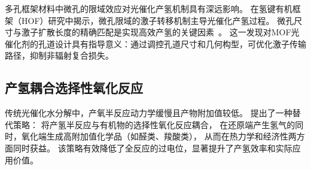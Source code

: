 多孔框架材料中微孔的限域效应对光催化产氢机制具有深远影响。
\citet{zhou2023micropore_exciton}在氢键有机框架（HOF）研究中揭示，微孔限域的激子转移机制主导光催化产氢过程。 %
微孔尺寸与激子扩散长度的精确匹配是实现高效产氢的关键因素~\citep{zhou2023micropore_exciton}。 %
这一发现对MOF光催化剂的孔道设计具有指导意义：通过调控孔道尺寸和几何构型，可优化激子传输路径，抑制非辐射复合损失。


\subsection{产氢耦合选择性氧化反应}

传统光催化水分解中，产氧半反应动力学缓慢且产物附加值较低。
\citet{lin2025coupled_oxidation}提出了一种替代策略：
将产氢半反应与有机物的选择性氧化反应耦合，
在还原端产生氢气的同时，氧化端生成高附加值化学品（如醛类、羧酸类），
从而在热力学和经济性两方面同时获益。 %
该策略有效降低了全反应的过电位，显著提升了产氢效率和实际应用价值。
